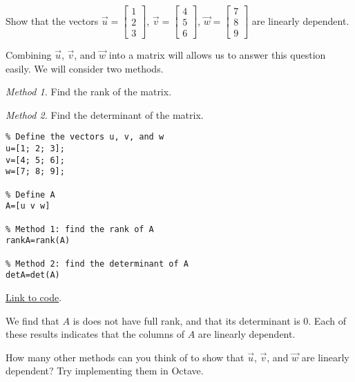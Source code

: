 \documentclass{ximera}
\begin{document}
\begin{example}\label{ex:vecsToMatrix}
    Show that the vectors $\vec{u}=\begin{bmatrix}1\\2\\3\end{bmatrix}$, $\vec{v}=\begin{bmatrix}4\\5\\6\end{bmatrix}$, $\vec{w}=\begin{bmatrix}7\\8\\9\end{bmatrix}$ are linearly dependent.
    \begin{explanation}
        Combining $\vec{u}$, $\vec{v}$, and $\vec{w}$ into a matrix will allows us to answer this question easily.  We will consider two methods.

        \emph{Method 1.} Find the rank of the matrix.
        
        \emph{Method 2.} Find the determinant of the matrix.
        \begin{verbatim}
% Define the vectors u, v, and w
u=[1; 2; 3];
v=[4; 5; 6];
w=[7; 8; 9];

% Define A
A=[u v w]

% Method 1: find the rank of A
rankA=rank(A)

% Method 2: find the determinant of A
detA=det(A)
        \end{verbatim}
        
\href{https://sagecell.sagemath.org/?z=eJxVjTsKwzAQRHuB7jCNIQE3dv5ZVAjS5gTChYnW2JhI4Mjy9SPlA0kz7OzOmy1w4W5wjNAzIt-Cnx6YS8QSrbNYpJiVqQg1YdOQFFGZLWFH2Ge3KHMgHAmn7KQovm1aCq3MjIileR-uHHpvUZ2RAvb1bmrdCN_lcB61yrrS6z-g_gEsB57ug2td-HBpo1WSRD0Bo444Hw==&lang=octave&interacts=eJyLjgUAARUAuQ==}{Link to code}.  

We find that $A$ is does not have full rank, and that its determinant is $0$.  Each of these results indicates that the columns of $A$ are linearly dependent.
\end{explanation}

How many other methods can you think of to show that $\vec{u}$, $\vec{v}$, and $\vec{w}$ are linearly dependent?  Try implementing them in Octave.
\end{example}
\end{document}
